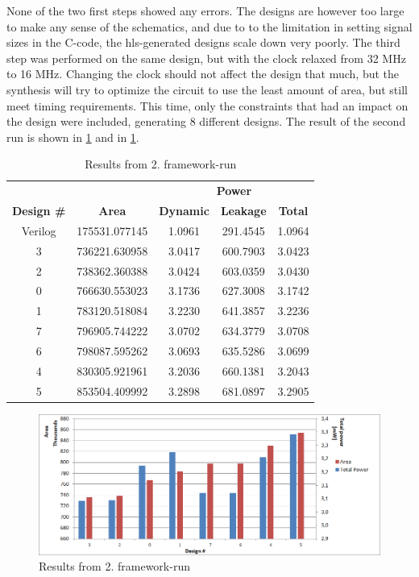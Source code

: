 None of the two first steps showed any errors. The designs are however too large to make any sense of the schematics, and due to to the limitation in setting signal sizes in the C-code, the \gls{hls}-generated designs scale down very poorly. The third step was performed on the same design, but with the clock relaxed from 32 MHz to 16 MHz. Changing the clock should not affect the design that much, but the synthesis will try to optimize the circuit to use the least amount of area, but still meet timing requirements. This time, only the constraints that had an impact on the design were included, generating 8 different designs. The result of the second run is shown in \cref{tab:resultgraphframeworkrun2} and in \cref{fig:resultgraphframeworkrun2}.
\begin{table}[hbtp]
    \centering
    \begin{tabular}{ccccc}
    & & \multicolumn{3}{c}{\textbf{Power}} \\
    \cline{3-5}
    \textbf{Design \#} & \textbf{Area} & \textbf{Dynamic} & \textbf{Leakage} & \textbf{Total} \\
    \toprule
    Verilog & 175531.077145 & 1.0961 & 291.4545 & 1.0964 \\
    3 & 736221.630958 & 3.0417 & 600.7903 & 3.0423 \\
    2 & 738362.360388 & 3.0424 & 603.0359 & 3.0430 \\
    0 & 766630.553023 & 3.1736 & 627.3008 & 3.1742 \\
    1 & 783120.518084 & 3.2230 & 641.3857 & 3.2236 \\
    7 & 796905.744222 & 3.0702 & 634.3779 & 3.0708 \\
    6 & 798087.595262 & 3.0693 & 635.5286 & 3.0699 \\
    4 & 830305.921961 & 3.2036 & 660.1381 & 3.2043 \\
    5 & 853504.409992 & 3.2898 & 681.0897 & 3.2905 \\

    \bottomrule
    \end{tabular}
    \caption{Results from 2. framework-run}
    \label{tab:resultgraphframeworkrun2}
\end{table}

\begin{figure}[hbpt]
\centering
\includegraphics[width=\textwidth]{../figs/resultGraph2.png}
\caption{\label{fig:resultgraphframeworkrun2}Results from 2. framework-run}
\end{figure}

